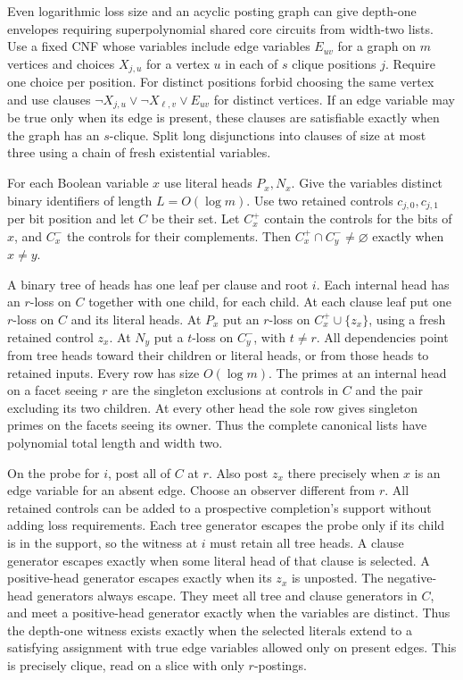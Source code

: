 Even logarithmic loss size and an acyclic posting
graph can give depth-one envelopes requiring
superpolynomial shared core circuits from width-two
lists. Use a fixed CNF whose variables include edge
variables $E_{uv}$ for a graph on $m$ vertices
and choices $X_{j,u}$ for a vertex $u$ in each
of $s$ clique positions $j$. Require one choice
per position. For distinct positions forbid
choosing the same vertex and use clauses
$\neg X_{j,u}\lor\neg X_{\ell,v}\lor E_{uv}$
for distinct vertices. If an edge variable may
be true only when its edge is present, these
clauses are satisfiable exactly when the graph
has an $s$-clique. Split long disjunctions into
clauses of size at most three using a chain of
fresh existential variables.

For each Boolean variable $x$ use literal heads
$P_x,N_x$. Give the variables distinct binary
identifiers of length $L=O(\log m)$. Use two
retained controls $c_{j,0},c_{j,1}$ per bit
position and let $C$ be their set. Let $C_x^+$
contain the controls for the bits of $x$, and
$C_x^-$ the controls for their complements.
Then $C_x^+\cap C_y^-\ne\varnothing$ exactly
when $x\ne y$.

A binary tree of heads has one leaf per clause
and root $i$. Each internal head has an $r$-loss
on $C$ together with one child, for each child.
At each clause leaf put one $r$-loss on $C$
and its literal heads. At $P_x$ put an $r$-loss
on $C_x^+\cup\{z_x\}$, using a fresh retained
control $z_x$. At $N_y$ put a $t$-loss on
$C_y^-$, with $t\ne r$. All dependencies point
from tree heads toward their children or literal
heads, or from those heads to retained inputs.
Every row has size $O(\log m)$. The primes
at an internal head on a facet seeing $r$
are the singleton exclusions at controls in
$C$ and the pair excluding its two children.
At every other head the sole row gives
singleton primes on the facets seeing its
owner. Thus the complete canonical lists
have polynomial total length and width two.

On the probe for $i$, post all of $C$ at $r$.
Also post $z_x$ there precisely when $x$ is an
edge variable for an absent edge. Choose an
observer different from $r$. All retained
controls can be added to a prospective
completion's support without adding loss
requirements. Each tree generator escapes
the probe only if its child is in the support,
so the witness at $i$ must retain all tree
heads. A clause generator escapes exactly
when some literal head of that clause is
selected. A positive-head generator escapes
exactly when its $z_x$ is unposted. The
negative-head generators always escape.
They meet all tree and clause generators
in $C$, and meet a positive-head generator
exactly when the variables are distinct.
Thus the depth-one witness exists exactly
when the selected literals extend to a satisfying
assignment with true edge variables allowed
only on present edges. This is precisely
clique, read on a slice with only $r$-postings.

